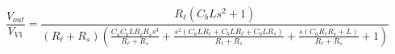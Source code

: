 \begin{equation}
\frac{V_{out}}{V_{V1}} = \frac{R_{\ell} \left(C_{b} L s^{2} + 1\right)}{\left(R_{\ell} + R_{s}\right) \left(\frac{C_{a} C_{b} L R_{\ell} R_{s} s^{3}}{R_{\ell} + R_{s}} + \frac{s^{2} \left(C_{a} L R_{\ell} + C_{b} L R_{\ell} + C_{b} L R_{s}\right)}{R_{\ell} + R_{s}} + \frac{s \left(C_{a} R_{\ell} R_{s} + L\right)}{R_{\ell} + R_{s}} + 1\right)}
\end{equation}

